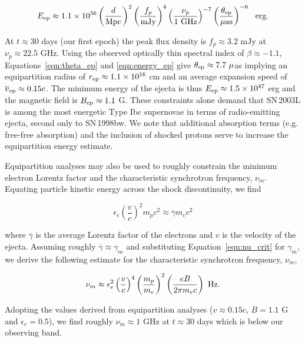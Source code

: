 \documentclass[12pt,preprint]{aastex}
\begin{document}
\begin{equation}
E_{\rm ep}\approx 1.1\times 10^{56} \left(\frac{d}{\rm Mpc}\right)^{2} \left(\frac{f_p}{\rm mJy}\right)^{4} \left(\frac{\nu_p}{\rm 1~GHz}\right)^{-7} \left(\frac{\theta_{\rm ep}}{\rm \mu as}\right)^{-6}~~\rm erg. 
\label{eqn:energy_ep}
\end{equation} 

At $t\approx 30$ days (our first epoch) the peak flux density is
$f_p\approx 3.2$ mJy at $\nu_p\approx 22.5$ GHz.  Using the observed
optically thin spectral index of $\beta\approx -1.1$,
Equations~\ref{eqn:theta_ep} and \ref{eqn:energy_ep} give $\theta_{\rm
ep}\approx 7.7~\mu$as implying an equipartition radius of $r_{\rm
ep}\approx 1.1\times 10^{16}$ cm and an average expansion speed of
$\overline{v}_{\rm ep}\approx 0.15c$.  The minimum energy of the
ejecta is thus $E_{\rm ep}\approx 1.5\times 10^{47}$ erg and the
magnetic field is $B_{\rm ep}\approx 1.1$ G. These constraints alone
demand that SN\,2003L is among the most energetic Type Ibc supernovae
in terms of radio-emitting ejecta, second only to SN\,1998bw.  We note
that additional absorption terms (e.g. free-free absorption) and the
inclusion of shocked protons serve to increase the equipartition
energy estimate.

Equipartition analyses may also be used to roughly constrain the
minimum electron Lorentz factor and the characteristic synchrotron
frequency, $\nu_m$.  Equating particle kinetic energy across the shock
discontinuity, we find

\begin{equation}
\epsilon_e \left( \frac{v}{c} \right)^2 m_p c^2 \approx \overline{\gamma} m_e c^2
\end{equation}

\noindent
where $\overline{\gamma}$ is the average Lorentz factor of the
electrons and $v$ is the velocity of the ejecta.  Assuming roughly
$\overline{\gamma}\approx \gamma_m$ and substituting Equation~\ref{eqn:nu_crit}
for $\gamma_m$, we derive the following estimate for the characteristic
synchrotron frequency, $\nu_m$,

\begin{equation}
\nu_m\approx \epsilon_e^2 \left(\frac{v}{c}\right)^4 \left(\frac{m_p}{m_e}\right)^2 \left(\frac{e B}{2\pi m_e c}\right)~\rm Hz.
\end{equation}

\noindent
Adopting the values derived from equipartition analyses ($v\approx
0.15c$, $B=1.1$ G and $\epsilon_e=0.5$), we find roughly $\nu_m\approx
1$ GHz at $t\approx 30$ days which is below our observing
band.  
\end{document}
